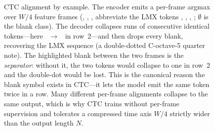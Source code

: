 \begin{figure}[htbp]
\caption[CTC alignment by example.]{CTC alignment by example.  The
encoder emits a per-frame argmax over $W/4$ feature frames
(, , ,  abbreviate the LMX tokens
, , , ;
$\emptyset$ is the blank class).  The decoder collapses runs of
consecutive identical tokens---here ~$\to$~ in
row~2---and then drops every blank, recovering the LMX sequence
 (a double-dotted C-octave-5 quarter note).
The highlighted blank between the two  frames is the
\emph{separator}: without it, the two  tokens would collapse
to one in row~2 and the double-dot would be lost.  This is the
canonical reason the blank symbol exists in CTC---it lets the model
emit the same token twice in a row.  Many different per-frame
alignments collapse to the same output, which is why CTC trains
without per-frame supervision and tolerates a compressed time axis
$W/4$ strictly wider than the output length $N$.}
\label{fig:ctc-alignment}
\end{figure}
